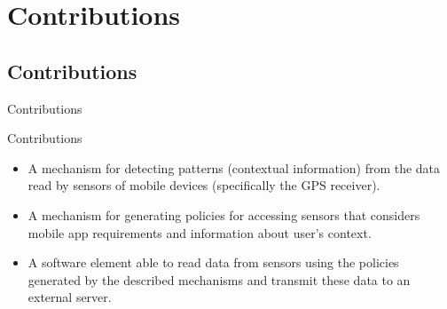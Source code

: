\section{Contributions}

\subsection{Contributions}

\begin{frame}{Contributions}
  \begin{block}{Contributions}
    \begin{itemize}
      \item A mechanism for detecting patterns (contextual information) from the data read by sensors of mobile devices (specifically the GPS receiver).
      \item A mechanism for generating policies for accessing sensors that considers mobile app requirements and information about user's context.
      \item A software element able to read data from sensors using the policies generated by the described mechanisms and transmit these data to an external server.
    \end{itemize}
  \end{block}
\end{frame}

